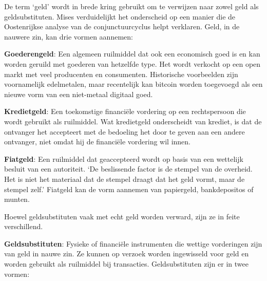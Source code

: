 De term `geld' wordt in brede kring gebruikt om te verwijzen naar zowel geld als geldsubstituten. Mises verduidelijkt het onderscheid op een manier die de Oostenrijkse analyse van de conjunctuurcyclus helpt verklaren. Geld, in de nauwere zin, kan drie vormen aannemen:

\vspace{1em}\noindent\textbf{Goederengeld}: Een algemeen ruilmiddel dat ook een economisch goed is en kan worden geruild met goederen van hetzelfde type. Het wordt verkocht op een open markt met veel producenten en consumenten. Historische voorbeelden zijn voornamelijk edelmetalen, maar recentelijk kan bitcoin worden toegevoegd als een nieuwe vorm van een niet-metaal digitaal goed.

\vspace{1em}\noindent\textbf{Kredietgeld}: Een toekomstige financiële vordering op een rechtspersoon die wordt gebruikt als ruilmiddel. Wat kredietgeld onderscheidt van krediet, is dat de ontvanger het accepteert met de bedoeling het door te geven aan een andere ontvanger, niet omdat hij de financiële vordering wil innen.

\vspace{1em}\noindent\textbf{Fiatgeld}: Een ruilmiddel dat geaccepteerd wordt op basis van een wettelijk besluit van een autoriteit. `De beslissende factor is de stempel van de overheid. Het is niet het materiaal dat de stempel draagt dat het geld vormt, maar de stempel zelf.'\autocite{171} Fiatgeld kan de vorm aannemen van papiergeld, bankdeposito\textquotesingle s of munten.

\vspace{1em}\noindent Hoewel geldsubstituten vaak met echt geld worden verward, zijn ze in feite verschillend.

\vspace{1em}\noindent\textbf{Geldsubstituten}: Fysieke of financiële instrumenten die wettige vorderingen zijn van geld in nauwe zin. Ze kunnen op verzoek worden ingewisseld voor geld en worden gebruikt als ruilmiddel bij transacties. Geldsubstituten zijn er in twee vormen:

